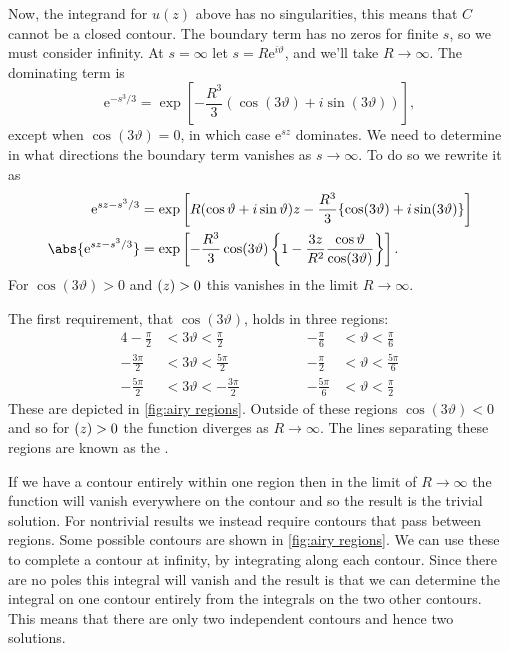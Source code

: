 \documentclass[fleqn]{NotesClass}
\newcommand*{\e}{\mathrm{e}}
\let\Re\relax
\DeclareMathOperator{\Re}{Re}
\begin{document}
    Now, the integrand for \(u(z)\) above has no singularities, this means that \(C\) cannot be a closed contour.
    The boundary term has no zeros for finite \(s\), so we must consider infinity.
    At \(s = \infty\) let \(s = R\e^{i\vartheta}\), and we'll take \(R \to \infty\).
    The dominating term is
    \begin{equation}
        \e^{-s^3/3} = \exp\left[ -\frac{R^3}{3}(\cos(3\vartheta) + i\sin(3\vartheta)) \right],
    \end{equation}
    except when \(\cos(3\vartheta) = 0\), in which case \(\e^{sz}\) dominates.
    We need to determine in what directions the boundary term vanishes as \(s \to \infty\).
    To do so we rewrite it as
    \begin{align}
        \e^{sz-s^3/3} &= \exp\left[ R(\cos\vartheta + i\sin\vartheta)z - \frac{R^3}{3}\{\cos(3\vartheta) + i\sin(3\vartheta)\} \right]\\
        \abs{\e^{sz - s^3/3}} &= \exp\left[ -\frac{R^3}{3}\cos(3\vartheta)\left\{ 1 - \frac{3z}{R^2}\frac{\cos\vartheta}{\cos(3\vartheta)} \right\} \right].
    \end{align}
    For \(\cos(3\vartheta) > 0\) and \(\Re(z) > 0\) this vanishes in the limit \(R \to \infty\).
    
    The first requirement, that \(\cos(3\vartheta)\), holds in three regions:
    \begin{alignat}{4}
        -\frac{\pi}{2} &< 3\vartheta < \frac{\pi}{2} \qquad\qquad & -\frac{\pi}{6} &< \vartheta < \frac{\pi}{6}\\
        -\frac{3\pi}{2} &< 3\vartheta < \frac{5\pi}{2} \qquad\qquad & -\frac{\pi}{2} &< \vartheta < \frac{5\pi}{6}\\
        -\frac{5\pi}{2} &< 3\vartheta < -\frac{3\pi}{2} \qquad\qquad & -\frac{5\pi}{6} &< \vartheta < \frac{\pi}{2}
    \end{alignat}
    These are depicted in \cref{fig:airy regions}.
    Outside of these regions \(\cos(3\vartheta) < 0\) and so for \(\Re(z) > 0\) the function diverges as \(R \to \infty\).
    The lines separating these regions are known as the .
    
    If we have a contour entirely within one region then in the limit of \(R \to \infty\) the function will vanish everywhere on the contour and so the result is the trivial solution.
    For nontrivial results we instead require contours that pass between regions.
    Some possible contours are shown in \cref{fig:airy regions}.
    We can use these to complete a contour at infinity, by integrating along each contour.
    Since there are no poles this integral will vanish and the result is that we can determine the integral on one contour entirely from the integrals on the two other contours.
    This means that there are only two independent contours and hence two solutions.
    
\end{document}
